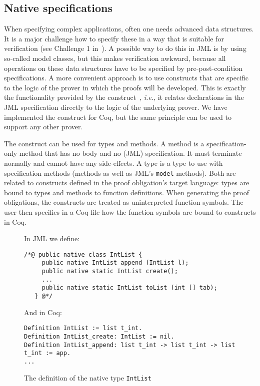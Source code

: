 \subsection{Native specifications}

When specifying complex applications, often one needs advanced data
structures. It is a major challenge how to specify these in a way that
is suitable for verification (see Challenge 1
in~\cite{LeavensLeinoMueller07}). A possible way to do this in JML is
by using so-called model classes, but this makes verification awkward,
because all operations on these data structures have to be specified
by pre-post-condition specifications. A more convenient approach is to
use constructs that are specific to the logic of the prover in which
the proofs will be developed. This is exactly the functionality
provided by the \native construct~\cite{Charles06},
\emph{i.e.}, it relates declarations in the JML specification directly
to the logic of the underlying prover. We have implemented the \native
construct for Coq, but the same principle can be used to support any
other prover.

The \native construct can be used for types and methods.  A \native
method is a specification-only method that has no body and no (JML)
specification. It must terminate normally and cannot have any
side-effects. A \native type is a type to use with specification
methods (\native methods as well as JML's {\tt model} methods). Both
are related to constructs defined in the proof obligation's target
language: \native types are bound to types and \native methods to
function definitions. When generating the proof obligations, the
\native constructs are treated as uninterpreted function symbols. The
user then specifies in a Coq file how the function symbols are bound
to constructs in Coq. 


\begin{figure}[t!]
{\small In JML we define:
\begin{verbatim}
/*@ public native class IntList {
     public native IntList append (IntList l);
     public native static IntList create();
     ...
     public native static IntList toList (int [] tab);
   } @*/ \end{verbatim}

And in Coq:
\begin{verbatim}
Definition IntList := list t_int.
Definition IntList_create: IntList := nil.  
Definition IntList_append: list t_int -> list t_int -> list t_int := app.
... \end{verbatim}}
\caption{The definition of the native type \texttt{IntList}}\label{CoqAnnot} 
\end{figure}

